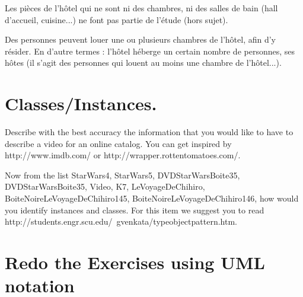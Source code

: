 Les pi\`eces de l'h\^otel qui ne sont ni des chambres, ni des salles de bain (hall d'accueil, cuisine...) ne font pas partie de l'\'etude (hors sujet).

Des personnes peuvent louer une ou plusieurs chambres de l'h\^otel, afin d'y r\'esider. En d'autre termes : l'h\^otel h\'eberge un certain nombre de personnes, ses h\^otes (il s'agit des personnes qui louent au moins une chambre de l'h\^otel...).


\section{Classes/Instances.} 
Describe with the best accuracy the information that you would like to have to describe a video for an online catalog. You can get inspired by http://www.imdb.com/ or http://wrapper.rottentomatoes.com/. 

Now from the list StarWars4, StarWars5, DVDStarWarsBoite35, DVDStarWarsBoite35, Video, K7, LeVoyageDeChihiro, BoiteNoireLeVoyageDeChihiro145, BoiteNoireLeVoyageDeChihiro146, how would you identify instances and classes. 
For this item we suggest you to read http://students.engr.scu.edu/~gvenkata/typeobjectpattern.htm.

\section{Redo the Exercises using UML notation}

\ifx\wholebook\relax\else\fi

